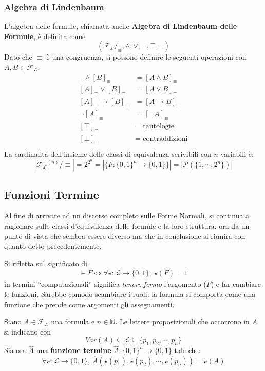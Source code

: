 \subsubsection{Algebra di Lindenbaum}
L'algebra delle formule, chiamata anche \textbf{Algebra di 
Lindenbaum delle Formule}, è definita come 
$$
(\mathscr{F_L}/_{\equiv}, \land, \lor, \bot, \top, \neg)
$$
Dato che $\equiv$ è una congruenza, si possono definire le seguenti operazioni con $A,B \in \mathscr{F_L}$:
\begin{align*}
  [A]_{\equiv} \land [B]_{\equiv} & = [A \land B]_{\equiv} \\
  [A]_{\equiv} \lor [B]_{\equiv} & = [A \lor B]_{\equiv} \\
  [A]_{\equiv} \rightarrow [B]_{\equiv} & = [A \rightarrow B]_{\equiv} \\
  \neg [A]_{\equiv} & = [\neg A]_{\equiv} \\
  [\top]_{\equiv} & = \text{ tautologie} \\
  [\bot]_{\equiv} & = \text{ contraddizioni} \\
\end{align*}
La cardinalità dell'insieme delle classi di equivalenza scrivibili con $n$ variabili è:
$$
|\mathscr{F_L}^{(n)}/\equiv| = 2 ^ {2^n} = |\{F: \{0,1\}^n \rightarrow \{0,1\}\}| = |\mathscr{P}(\{1,\cdots,2^n\})|
$$

\subsection{Funzioni Termine}
Al fine di arrivare ad un discorso completo sulle Forme Normali, si continua a ragionare sulle classi d'equivalenza delle formule e la loro struttura, ora da un punto di vista che sembra essere diverso ma che in conclusione si riunirà con quanto detto precedentemente. 

Si rifletta sul significato di 
\begin{align}
\label{fun:formula-computazionale}
\models F \iff \forall \mathcal{v}: \mathscr{L} \rightarrow \{0,1\},\ \mathcal{v}(F) = 1
\end{align}
in termini ``computazionali'' significa \textit{tenere fermo} l'argomento ($F$) e far cambiare le funzioni. Sarebbe comodo scambiare i ruoli: la formula si comporta come una funzione che prende come argomenti gli assegnamenti.

Siano $A \in \mathscr{F_L}$ una formula e $n \in \mathbb{N}$. Le lettere proposizionali che occorrono in $A$ si indicano con
$$
Var(A) \subseteq \mathscr{L} \subseteq \{p_1, p_2, \cdots, p_n\}
$$
Sia ora $\hat{A}$ una \textbf{funzione termine} $\hat{A} : \{0,1\}^n \rightarrow \{0,1\}$ tale che:
$$
\forall \mathcal{v}:\mathscr{L} \rightarrow \{0,1\},\ \hat{A}(\mathcal{v}(p_1), \mathcal{v}(p_2), \cdots, \mathcal{v}(p_n)) = \widetilde{\mathcal{v}}(A)
$$

